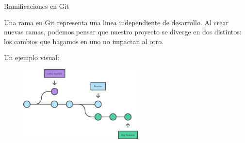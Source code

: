 \begin{frame}[t]{Ramificaciones en Git}


    Una rama en Git representa una linea independiente de desarrollo.
    Al crear nuevas ramas, podemos pensar que nuestro proyecto se diverge en dos distintos:
    los cambios que hagamos en uno no impactan al otro.

    \pause
    \vspace{0.5em}
    Un ejemplo visual:

    \begin{figure}[ht]
        \begin{center}
            \includegraphics[height=1.5in]{images/branch.png}
        \end{center}
    \end{figure}




\end{frame}

